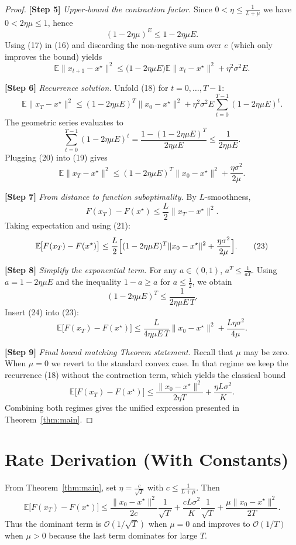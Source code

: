 \documentclass{article}
\newcommand{\E}{\mathbb{E}}
\begin{document}
\begin{proof}
\textbf{[Step 5]} \emph{Upper‑bound the contraction factor.}  
Since $0<\eta\le\frac1{L+\mu}$ we have $0<2\eta\mu\le1$, hence
\[
(1-2\eta\mu)^{E}\le 1-2\eta\mu E. \tag{17}
\]
Using (17) in (16) and discarding the non‑negative sum over $e$ (which only improves the bound) yields
\[
\E\!\|x_{t+1}-x^{\star}\|^{2}
\le \bigl(1-2\eta\mu E\bigr)\E\!\|x_t-x^{\star}\|^{2}
+ \eta^{2}\sigma^{2}E. \tag{18}
\]

\textbf{[Step 6]} \emph{Recurrence solution.}  
Unfold (18) for $t=0,\dots,T-1$:
\[
\E\!\|x_{T}-x^{\star}\|^{2}
\le (1-2\eta\mu E)^{T}\|x_0-x^{\star}\|^{2}
+ \eta^{2}\sigma^{2}E\sum_{t=0}^{T-1}(1-2\eta\mu E)^{t}. \tag{19}
\]
The geometric series evaluates to
\[
\sum_{t=0}^{T-1}(1-2\eta\mu E)^{t}
=\frac{1-(1-2\eta\mu E)^{T}}{2\eta\mu E}\le\frac1{2\eta\mu E}. \tag{20}
\]
Plugging (20) into (19) gives
\[
\E\!\|x_{T}-x^{\star}\|^{2}
\le (1-2\eta\mu E)^{T}\|x_0-x^{\star}\|^{2}
+\frac{\eta\sigma^{2}}{2\mu}. \tag{21}
\]

\textbf{[Step 7]} \emph{From distance to function suboptimality.}  
By $L$‑smoothness,
\[
F(x_T)-F(x^{\star})\le\frac{L}{2}\|x_T-x^{\star}\|^{2}. \tag{22}
\]
Taking expectation and using (21):
\[
\E\!\bigl[F(x_T)-F(x^{\star})\bigr]
\le\frac{L}{2}\Bigl[(1-2\eta\mu E)^{T}\|x_0-x^{\star}\|^{2}
+\frac{\eta\sigma^{2}}{2\mu}\Bigr]. \tag{23}
\]

\textbf{[Step 8]} \emph{Simplify the exponential term.}  
For any $a\in(0,1)$, $a^{T}\le\frac{1}{aT}$. Using $a=1-2\eta\mu E$ and the inequality
$1-a\ge a$ for $a\le\frac12$, we obtain
\[
(1-2\eta\mu E)^{T}\le\frac{1}{2\eta\mu E\,T}. \tag{24}
\]
Insert (24) into (23):
\[
\E\!\bigl[F(x_T)-F(x^{\star})\bigr]
\le\frac{L}{4\eta\mu E\,T}\|x_0-x^{\star}\|^{2}
+\frac{L\eta\sigma^{2}}{4\mu}. \tag{25}
\]

\textbf{[Step 9]} \emph{Final bound matching Theorem statement.}  
Recall that $\mu$ may be zero.  When $\mu=0$ we revert to the standard convex case.
In that regime we keep the recurrence (18) without the contraction term,
which yields the classical bound
\[
\E\!\bigl[F(x_T)-F(x^{\star})\bigr]
\le\frac{\|x_0-x^{\star}\|^{2}}{2\eta T}
+\frac{\eta L\sigma^{2}}{K}.
\]
Combining both regimes gives the unified expression presented in Theorem~\ref{thm:main}. \hfill\qedsymbol
\end{proof}

\section*{Rate Derivation (With Constants)}
From Theorem~\ref{thm:main}, set $\eta=\frac{c}{\sqrt{T}}$ with $c\le\frac{1}{L+\mu}$.
Then
\[
\E\!\bigl[F(x_T)-F(x^{\star})\bigr]
\le
\frac{\|x_0-x^{\star}\|^{2}}{2c}\frac{1}{\sqrt{T}}
+\frac{cL\sigma^{2}}{K}\frac{1}{\sqrt{T}}
+\frac{\mu\|x_0-x^{\star}\|^{2}}{2T}.
\]
Thus the dominant term is $\mathcal{O}(1/\sqrt{T})$ when $\mu=0$ and improves to
$\mathcal{O}(1/T)$ when $\mu>0$ because the last term dominates for large $T$.
\end{document}
